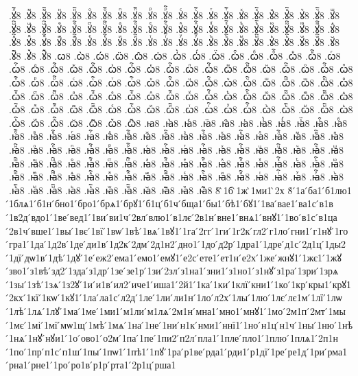 {.ꙋⷧ҇8
.ꙋⷨ8
.ꙋⷨ҇8
.ꙋⷩ8
.ꙋⷩ҇8
.ꙋⷪ8
.ꙋⷪ҇8
.ꙋⷫ8
.ꙋⷫ҇8
.ꙋⷬ8
.ꙋⷬ҇8
.ꙋⷭ8
.ꙋⷭ҇8
.ꙋⷮ8
.ꙋⷮ҇8
.ꙋⷯ8
.ꙋⷯ҇8
.ꙋⷰ8
.ꙋⷰ҇8
.ꙋⷱ8
.ꙋⷱ҇8
.ꙋⷲ8
.ꙋⷲ҇8
.ꙋⷳ8
.ꙋⷳ҇8
.ꙋⷴ8
.ꙋⷴ҇8
.ꙋⷵ8
.ꙋⷵ҇8
.ꙋⷶ8
.ꙋⷶ҇8
.ꙋⷷ8
.ꙋⷷ҇8
.ꙋⷸ8
.ꙋⷸ҇8
.ꙋⷹ8
.ꙋⷹ҇8
.ꙋⷺ8
.ꙋⷺ҇8
.ꙋⷻ8
.ꙋⷻ҇8
.ꙋⷼ8
.ꙋⷼ҇8
.ꙋⷽ8
.ꙋⷽ҇8
.ꙋⷾ8
.ꙋⷾ҇8
.ꙋⷿ8
.ꙋⷿ҇8
.ꙋꙴ8
.ꙋꙴ҇8
.ꙋꙵ8
.ꙋꙵ҇8
.ꙋꙶ8
.ꙋꙶ҇8
.ꙋꙷ8
.ꙋꙷ҇8
.ꙋꙸ8
.ꙋꙸ҇8
.ꙋꙹ8
.ꙋꙹ҇8
.ꙋꙺ8
.ꙋꙺ҇8
.ꙋꙻ8
.ꙋꙻ҇8
.ꙋ꙼8
.ꙋ꙼҇8
.ꙋ꙽8
.ꙋ꙽҇8
.ꙍ8
.ꙍ̀8
.ꙍ́8
.ꙍ̈8
.ꙍ̑8
.ꙍ҆8
.ꙍ҆̀8
.ꙍ҆́8
.ꙍ҆̈8
.ꙍ҆̑8
.ꙍⷠ8
.ꙍⷠ҇8
.ꙍⷡ8
.ꙍⷡ҇8
.ꙍⷢ8
.ꙍⷢ҇8
.ꙍⷣ8
.ꙍⷣ҇8
.ꙍⷤ8
.ꙍⷤ҇8
.ꙍⷥ8
.ꙍⷥ҇8
.ꙍⷦ8
.ꙍⷦ҇8
.ꙍⷧ8
.ꙍⷧ҇8
.ꙍⷨ8
.ꙍⷨ҇8
.ꙍⷩ8
.ꙍⷩ҇8
.ꙍⷪ8
.ꙍⷪ҇8
.ꙍⷫ8
.ꙍⷫ҇8
.ꙍⷬ8
.ꙍⷬ҇8
.ꙍⷭ8
.ꙍⷭ҇8
.ꙍⷮ8
.ꙍⷮ҇8
.ꙍⷯ8
.ꙍⷯ҇8
.ꙍⷰ8
.ꙍⷰ҇8
.ꙍⷱ8
.ꙍⷱ҇8
.ꙍⷲ8
.ꙍⷲ҇8
.ꙍⷳ8
.ꙍⷳ҇8
.ꙍⷴ8
.ꙍⷴ҇8
.ꙍⷵ8
.ꙍⷵ҇8
.ꙍⷶ8
.ꙍⷶ҇8
.ꙍⷷ8
.ꙍⷷ҇8
.ꙍⷸ8
.ꙍⷸ҇8
.ꙍⷹ8
.ꙍⷹ҇8
.ꙍⷺ8
.ꙍⷺ҇8
.ꙍⷻ8
.ꙍⷻ҇8
.ꙍⷼ8
.ꙍⷼ҇8
.ꙍⷽ8
.ꙍⷽ҇8
.ꙍⷾ8
.ꙍⷾ҇8
.ꙍⷿ8
.ꙍⷿ҇8
.ꙍꙴ8
.ꙍꙴ҇8
.ꙍꙵ8
.ꙍꙵ҇8
.ꙍꙶ8
.ꙍꙶ҇8
.ꙍꙷ8
.ꙍꙷ҇8
.ꙍꙸ8
.ꙍꙸ҇8
.ꙍꙹ8
.ꙍꙹ҇8
.ꙍꙺ8
.ꙍꙺ҇8
.ꙍꙻ8
.ꙍꙻ҇8
.ꙍ꙼8
.ꙍ꙼҇8
.ꙍ꙽8
.ꙍ꙽҇8
.ꙗ8
.ꙗ̀8
.ꙗ́8
.ꙗ̈8
.ꙗ̑8
.ꙗ҆8
.ꙗ҆̀8
.ꙗ҆́8
.ꙗ҆̈8
.ꙗ҆̑8
.ꙗⷠ8
.ꙗⷠ҇8
.ꙗⷡ8
.ꙗⷡ҇8
.ꙗⷢ8
.ꙗⷢ҇8
.ꙗⷣ8
.ꙗⷣ҇8
.ꙗⷤ8
.ꙗⷤ҇8
.ꙗⷥ8
.ꙗⷥ҇8
.ꙗⷦ8
.ꙗⷦ҇8
.ꙗⷧ8
.ꙗⷧ҇8
.ꙗⷨ8
.ꙗⷨ҇8
.ꙗⷩ8
.ꙗⷩ҇8
.ꙗⷪ8
.ꙗⷪ҇8
.ꙗⷫ8
.ꙗⷫ҇8
.ꙗⷬ8
.ꙗⷬ҇8
.ꙗⷭ8
.ꙗⷭ҇8
.ꙗⷮ8
.ꙗⷮ҇8
.ꙗⷯ8
.ꙗⷯ҇8
.ꙗⷰ8
.ꙗⷰ҇8
.ꙗⷱ8
.ꙗⷱ҇8
.ꙗⷲ8
.ꙗⷲ҇8
.ꙗⷳ8
.ꙗⷳ҇8
.ꙗⷴ8
.ꙗⷴ҇8
.ꙗⷵ8
.ꙗⷵ҇8
.ꙗⷶ8
.ꙗⷶ҇8
.ꙗⷷ8
.ꙗⷷ҇8
.ꙗⷸ8
.ꙗⷸ҇8
.ꙗⷹ8
.ꙗⷹ҇8
.ꙗⷺ8
.ꙗⷺ҇8
.ꙗⷻ8
.ꙗⷻ҇8
.ꙗⷼ8
.ꙗⷼ҇8
.ꙗⷽ8
.ꙗⷽ҇8
.ꙗⷾ8
.ꙗⷾ҇8
.ꙗⷿ8
.ꙗⷿ҇8
.ꙗꙴ8
.ꙗꙴ҇8
.ꙗꙵ8
.ꙗꙵ҇8
.ꙗꙶ8
.ꙗꙶ҇8
.ꙗꙷ8
.ꙗꙷ҇8
.ꙗꙸ8
.ꙗꙸ҇8
.ꙗꙹ8
.ꙗꙹ҇8
.ꙗꙺ8
.ꙗꙺ҇8
.ꙗꙻ8
.ꙗꙻ҇8
.ꙗ꙼8
.ꙗ꙼҇8
.ꙗ꙽8
.ꙗ꙽҇8
8̀
̀1б
̀1ж
̀1ми1
̀2х
8́
́1а
́ба1
́б1лю1
́1блѧ1
́б1н
́бно1
́бро1
́брѧ1
́брꙋ1
́б1ц
́б1ч
́бща1
́бы1
́бѣ1
́бꙋ1
́1ва
́вае1
́ва1с
́в1в
́1в2д
́вдо1
́1ве
́вед1
́1ви
́ви1ч
́2вл
́влю1
́в1лє
́2в1н
́вне1
́внѧ1
́внꙋ1
́1во
́в1с
́в1ца
́2в1ч
́вше1
́1вы
́1вє
́1вї
́1вѡ
́1вѣ
́1вѧ
́1вꙋ1
́1га
́2гг
́1ги
́1г2к
́гл2
́г1ло
́гни1
́г1нꙋ
́1го
́гра1
́1да
́1д2в
́1де
́ди1в
́1д2к
́2дм
́2д1н2
́дно1
́1до
́д2р
́1дра1
́1дре
́д1с
́2д1ц
́1ды2
́1дї
́дѡ1в
́1дѣ
́1дꙋ
́1е
́еж2
́ема1
́емо1
́емꙋ1
́е2с
́ете1
́ет1н
́е2х
́1же
́жнꙋ1
́1жє1
́1жꙋ
́зво1
́з1вѣ
́зд2
́1зда
́з1др
́1зе
́зе1р
́1зи
́2зл
́з1на1
́зни1
́з1но1
́з1нꙋ
́з1ра
́1зри
́1зрѧ
́1зы
́1зѣ
́1зѧ
́1з2ꙋ
́1и
́и1в
́ил2
́иче1
́иша1
́2й1
́1ка
́1ки
́1клї
́кни1
́1ко
́1кр
́кры1
́крꙋ1
́2кх
́1кї
́1кѡ
́1кꙋ1
́1ла
́ла1с
́л2д
́1ле
́1ли
́ли1н
́1ло
́л2х
́1лы
́1лю
́1лє
́лє1м
́1лї
́1лѡ
́1лѣ
́1лѧ
́1лꙋ
́1ма
́1ме
́1ми1
́м1ли
́м1лѧ
́2м1н
́мна1
́мно1
́мнꙋ1
́1мо
́2м1п
́2мт
́1мы
́1мє
́1мі
́1мї
́мѡ1щ
́1мѣ
́1мѧ
́1на
́1не
́1ни
́н1к
́нми1
́ннї1
́1но
́н1ц
́н1ч
́1ны
́1ню
́1нѣ
́1нѧ
́1нꙋ
́нꙋи1
́1о
́ово1
́о2м
́1па
́1пе
́1пи2
́п2л
́пла1
́1пле
́пло1
́1плю
́1плѧ1
́2п1н
́1по
́1пр
́п1с
́п1ш
́1пы
́1пѡ1
́1пѣ1
́1пꙋ
́1ра
́р1ве
́рда1
́рди1
́р1дї
́1ре
́ре1д
́1ри
́рма1
́рна1
́рне1
́1ро
́ро1в
́р1р
́рта1
́2р1ц
́рша1
}
